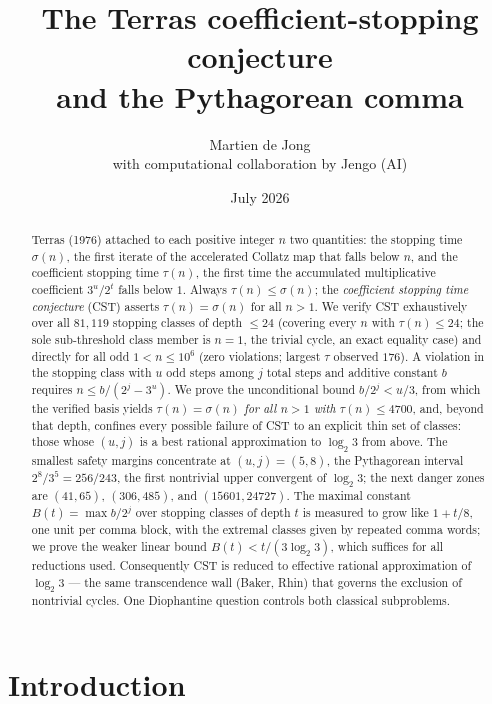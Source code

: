 \documentclass[10pt]{article}
\title{The Terras coefficient-stopping conjecture\\ and the Pythagorean comma}
\author{Martien de Jong\\[2pt]
\normalsize with computational collaboration by Jengo (AI)}
\date{July 2026}
\theoremstyle{definition}
\theoremstyle{remark}
\newcommand{\lb}{\log_2 3}
\begin{document}
\maketitle

\begin{abstract}
Terras (1976) attached to each positive integer $n$ two quantities: the stopping
time $\sigma(n)$, the first iterate of the accelerated Collatz map that falls
below $n$, and the coefficient stopping time $\tau(n)$, the first time the
accumulated multiplicative coefficient $3^{u}/2^{t}$ falls below $1$. Always
$\tau(n) \le \sigma(n)$; the \emph{coefficient stopping time conjecture} (CST)
asserts $\tau(n) = \sigma(n)$ for all $n > 1$. We verify CST exhaustively over
all $81{,}119$ stopping classes of depth $\le 24$ (covering every $n$ with
$\tau(n) \le 24$; the sole sub-threshold class member is $n = 1$, the trivial
cycle, an exact equality case) and directly for all odd $1 < n \le 10^{6}$
(zero violations; largest $\tau$ observed $176$). A violation in the stopping
class with $u$ odd steps among $j$ total steps and additive constant $b$
requires $n \le b/(2^{j}-3^{u})$. We prove the unconditional bound
$b/2^{j} < u/3$, from which the verified basis yields
$\tau(n)=\sigma(n)$ \emph{for all $n>1$ with $\tau(n) \le 4700$}, and, beyond
that depth, confines every possible failure of CST to an explicit thin set of
classes: those whose $(u,j)$ is a best rational approximation to $\lb$ from
above. The smallest safety margins concentrate at $(u,j)=(5,8)$, the
Pythagorean interval $2^{8}/3^{5} = 256/243$, the first nontrivial upper
convergent of $\lb$; the next danger zones are $(41,65)$, $(306,485)$, and
$(15601,24727)$. The maximal constant $B(t) = \max b/2^{j}$ over stopping
classes of depth $t$ is measured to grow like $1 + t/8$, one unit per comma
block, with the extremal classes given by repeated comma words; we prove the
weaker linear bound $B(t) < t/(3\lb)$, which suffices for all reductions used.
Consequently CST is reduced to effective rational approximation of $\lb$ ---
the same transcendence wall (Baker, Rhin) that governs the exclusion of
nontrivial cycles. One Diophantine question controls both classical
subproblems.
\end{abstract}

\section{Introduction}
\end{document}
